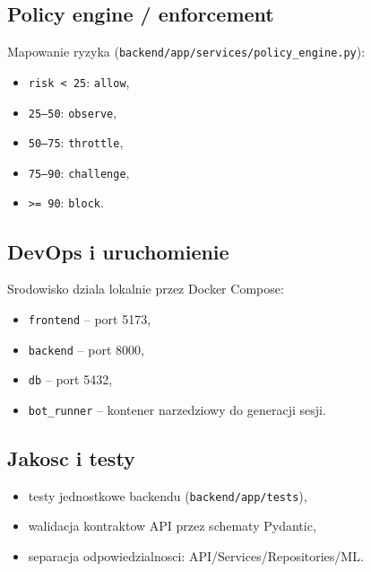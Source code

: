 \subsection{Policy engine / enforcement}
Mapowanie ryzyka (\texttt{backend/app/services/policy\_engine.py}):
\begin{itemize}
  \item \texttt{risk < 25}: \texttt{allow},
  \item \texttt{25--50}: \texttt{observe},
  \item \texttt{50--75}: \texttt{throttle},
  \item \texttt{75--90}: \texttt{challenge},
  \item \texttt{>= 90}: \texttt{block}.
\end{itemize}

\subsection{DevOps i uruchomienie}
Srodowisko dziala lokalnie przez Docker Compose:
\begin{itemize}
  \item \texttt{frontend} -- port 5173,
  \item \texttt{backend} -- port 8000,
  \item \texttt{db} -- port 5432,
  \item \texttt{bot\_runner} -- kontener narzedziowy do generacji sesji.
\end{itemize}

\subsection{Jakosc i testy}
\begin{itemize}
  \item testy jednostkowe backendu (\texttt{backend/app/tests}),
  \item walidacja kontraktow API przez schematy Pydantic,
  \item separacja odpowiedzialnosci: API/Services/Repositories/ML.
\end{itemize}

